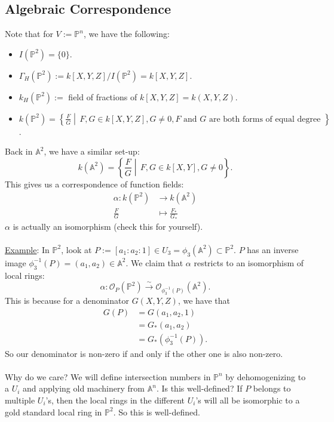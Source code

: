 \documentclass[12pt]{article}
\theoremstyle{definition}
\begin{document}
\subsection{Algebraic Correspondence}
Note that for $V:=\mathbb{P}^n$, we have the following:
\begin{itemize}
    \item $I(\mathbb{P}^2)=\{0\}$.
    \item $\Gamma_H(\mathbb{P}^2):=k[X,Y,Z]/I(\mathbb{P}^2)=k[X,Y,Z]$.
    \item $k_H(\mathbb{P}^2):=$ field of fractions of $k[X,Y,Z]=k(X,Y,Z)$.
    \item $k(\mathbb{P}^2)=\left\{\frac{F}{G}\middle|\,F,G\in k[X,Y,Z],G\neq0,F\text{ and }G\text{ are both forms of equal degree }\right\}$.
\end{itemize}
Back in $\mathbb{A}^2$, we have a similar set-up:
\[k(\mathbb{A}^2)=\left\{\frac{F}{G}\middle|\,F,G\in k[X,Y],G\neq0\right\}.\]
This gives us a correspondence of function fields:
\begin{align*}
    \alpha:k(\mathbb{P}^2)&\to k(\mathbb{A}^2)\\
    \frac{F}{G}&\mapsto\frac{F_*}{G_*}
\end{align*}
$\alpha$ is actually an isomorphism (check this for yourself).\\\\
\underline{Example}: In $\mathbb{P}^2$, look at $P:=[a_1:a_2:1]\in U_3=\phi_3(\mathbb{A}^2)\subset\mathbb{P}^2$. $P$ has an inverse image $\phi_3^{-1}(P)=(a_1,a_2)\in\mathbb{A}^2$. We claim that $\alpha$ restricts to an isomorphism of local rings:
\[\alpha:\mathcal{O}_P(\mathbb{P}^2)\stackrel{\sim}{\longrightarrow}\mathcal{O}_{\phi_3^{-1}(P)}(\mathbb{A}^2).\]
This is because for a denominator $G(X,Y,Z)$, we have that
\begin{align*}
    G(P)&=G(a_1,a_2,1)\\
    &=G_*(a_1,a_2)\\
    &=G_*(\phi_3^{-1}(P)).
\end{align*}
So our denominator is non-zero if and only if the other one is also non-zero.\\\\
Why do we care? We will define intersection numbers in $\mathbb{P}^n$ by dehomogenizing to a $U_i$ and applying old machinery from $\mathbb{A}^n$. Is this well-defined? If $P$ belongs to multiple $U_i$'s, then the local rings in the different $U_i$'s will all be isomorphic to a gold standard local ring in $\mathbb{P}^2$. So this is well-defined. \checkmark
\end{document}
